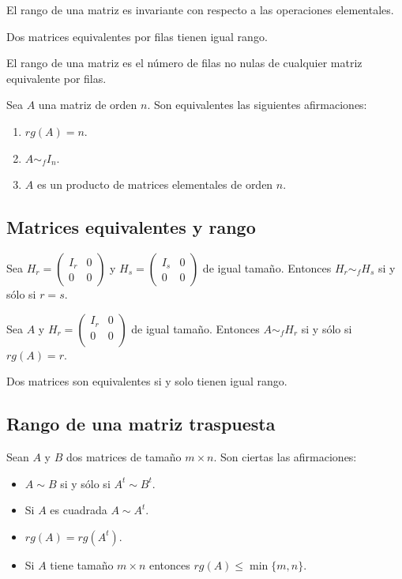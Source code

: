 El rango de una matriz es invariante con respecto a las operaciones elementales.


Dos matrices equivalentes por filas tienen igual rango.



El rango de una matriz es el número de filas no nulas de cualquier matriz equivalente por filas.



Sea $A$ una matriz de orden $n$. Son equivalentes las siguientes afirmaciones:
\begin{enumerate}
\item $rg(A)=n$.
\item $A \sim_f I_n$.
\item $A$ es un producto de matrices elementales de orden $n$.
\end{enumerate}


\subsection{Matrices equivalentes y rango}


Sea $H_r = \begin{pmatrix} I_r & 0 \\ 0 & 0 \end{pmatrix}$ y $H_s = \begin{pmatrix} I_s & 0 \\ 0 & 0 \end{pmatrix}$ de igual tamaño. Entonces $H_r \sim_f H_s$ si y sólo si $r=s$.



Sea $A$ y $H_r = \begin{pmatrix}
I_r & 0 \\
0 & 0 \\
\end{pmatrix}$ de igual tamaño. Entonces $A \sim_f H_r$ si y sólo si $rg(A)=r$.



Dos matrices son equivalentes si y solo tienen igual rango.


\subsection{Rango de una matriz traspuesta}


Sean $A$ y $B$ dos matrices de tamaño $m \times n$. Son ciertas las afirmaciones:
\begin{itemize}
\item $A \sim B$ si y sólo si $A^t \sim B^t$.
\item Si $A$ es cuadrada $A \sim A^t$.
\item $rg(A) = rg(A^t)$.
\item Si $A$ tiene tamaño $m \times n$ entonces $rg(A) \leq \min\{m,n\}$.
\end{itemize}


